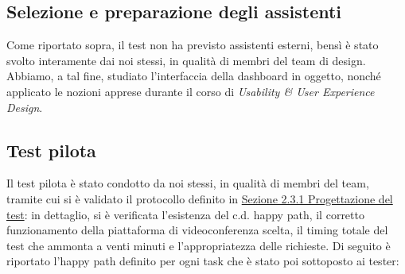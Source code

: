 \subsection{Selezione e preparazione degli assistenti}
\label{ss:selezione-preparazione-assistenti}
Come riportato sopra, il test non ha previsto assistenti esterni, bensì è stato svolto interamente dai noi stessi, in qualità di membri del team di design. Abbiamo, a tal fine, studiato l'interfaccia della dashboard in oggetto, nonché applicato le nozioni apprese durante il corso di \textit{Usability \& User Experience Design}.

\subsection{Test pilota}
Il test pilota è stato condotto da noi stessi, in qualità di membri del team, tramite cui si è validato il protocollo definito in \hyperref[ss:vre-progettazione-test]{Sezione 2.3.1 Progettazione del test}: in dettaglio, si è verificata l'esistenza del c.d. happy path, il corretto funzionamento della piattaforma di videoconferenza scelta, il timing totale del test che ammonta a venti minuti e l'appropriatezza delle richieste.
\noindent
Di seguito è riportato l'happy path definito per ogni task che è stato poi sottoposto ai tester:
